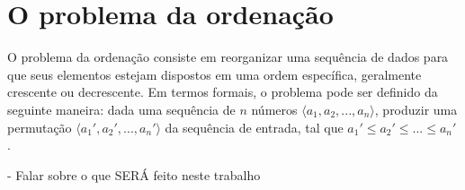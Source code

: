 \section{O problema da ordenação}
O problema da ordenação consiste em reorganizar uma sequência de dados para que seus elementos estejam dispostos em uma ordem específica, geralmente crescente ou decrescente. Em termos formais, o problema pode ser definido da seguinte maneira: dada uma sequência de  $n$  números  $\langle a_1, a_2, ..., a_n \rangle$, produzir uma permutação $\langle a_1', a_2', ..., a_n' \rangle$ da sequência de entrada, tal que $a_1' \le a_2' \le ... \le a_n'$  \cite[p. 5]{Cormen2009}.

- Falar sobre o que SERÁ feito neste trabalho